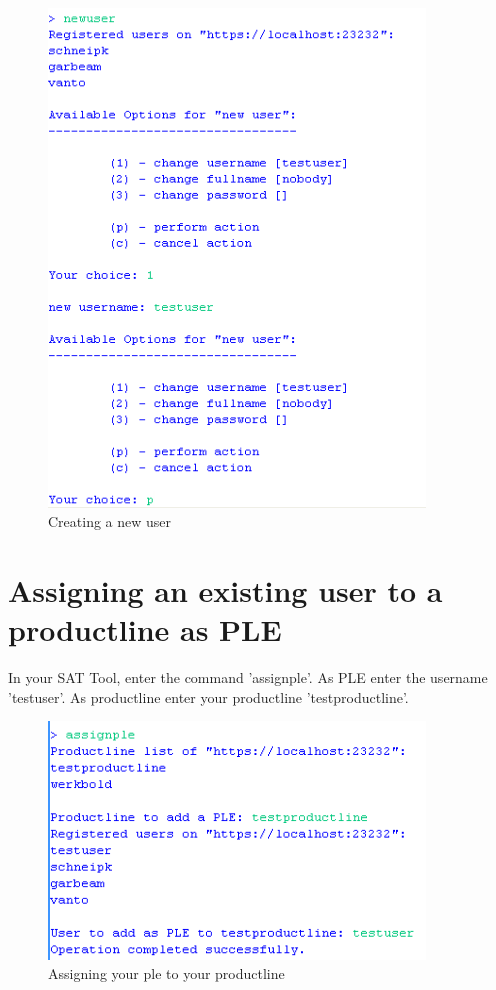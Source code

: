 \begin{figure}[h!]
\begin{center}
\includegraphics[width=10cm]{tutorial2.png}
   \caption{Creating a new user}
\end{center}
\end{figure}\par


\section{Assigning an existing user to a productline as PLE}
In your SAT Tool, enter the command 'assignple'. 
As PLE enter the username 'testuser'. As productline enter your productline 'testproductline'.

\begin{figure}[h!]
\begin{center}
\includegraphics[width=10cm]{tutorial3.png}
   \caption{Assigning your ple to your productline}
\end{center}
\end{figure}\par



